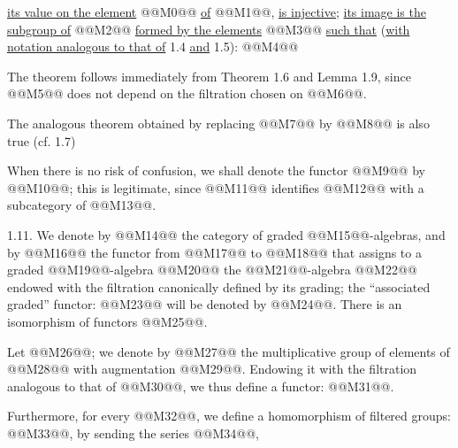\uline{its value on the element} @@M0@@ \uline{of} @@M1@@, \uline{is injective}; \uline{its image is the subgroup of} @@M2@@ \uline{formed by the elements} @@M3@@ \uline{such that} (\uline{with notation analogous to that of} 1.4 \uline{and} 1.5):
@@M4@@

The theorem follows immediately from Theorem 1.6 and Lemma 1.9, since @@M5@@ does not depend on the filtration chosen on @@M6@@.

The analogous theorem obtained by replacing @@M7@@ by @@M8@@ is also true (cf. 1.7)

When there is no risk of confusion, we shall denote the functor @@M9@@ by @@M10@@; this is legitimate, since @@M11@@ identifies @@M12@@ with a subcategory of @@M13@@.

1.11. We denote by @@M14@@ the category of graded @@M15@@-algebras, and by @@M16@@ the functor from @@M17@@ to @@M18@@ that assigns to a graded @@M19@@-algebra @@M20@@ the @@M21@@-algebra @@M22@@ endowed with the filtration canonically defined by its grading; the ``associated graded'' functor: @@M23@@ will be denoted by @@M24@@. There is an isomorphism of functors @@M25@@.

Let @@M26@@; we denote by @@M27@@ the multiplicative group of elements of @@M28@@ with augmentation @@M29@@. Endowing it with the filtration analogous to that of @@M30@@, we thus define a functor: @@M31@@.

Furthermore, for every @@M32@@, we define a homomorphism of filtered groups: @@M33@@, by sending the series @@M34@@,
